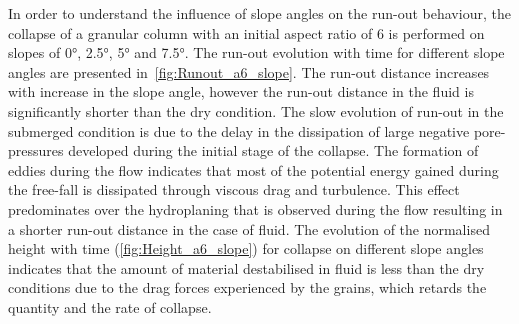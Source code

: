 \documentclass[epj,twocolumn]{webofc}
\begin{document}
In order to understand the influence of slope angles on the run-out behaviour, 
the collapse of a granular column with an initial aspect ratio of 6 is 
performed on slopes of 0\si{\degree}, 2.5\si{\degree}, 5\si{\degree} and 
7.5\si{\degree}. The run-out evolution with time for different slope angles are 
presented in~\cref{fig:Runout_a6_slope}. The run-out distance increases with 
increase in the slope angle, however the run-out distance in the fluid is 
significantly shorter than the dry condition. The slow evolution of run-out in 
the submerged condition is due to the delay in the dissipation of large 
negative pore-pressures developed during the initial stage of the collapse. The 
formation of eddies during the flow indicates that most of the potential energy 
gained during the free-fall is dissipated through viscous drag and turbulence. 
This effect predominates over the hydroplaning that is observed during 
the flow resulting in a shorter run-out distance in the case of fluid. The 
evolution of the normalised height with time (\cref{fig:Height_a6_slope}) for 
collapse on different slope angles indicates that the 
amount of material destabilised in fluid is less than the dry conditions due to 
the drag forces experienced by the grains, which retards the quantity and the 
rate of collapse.
\end{document}
